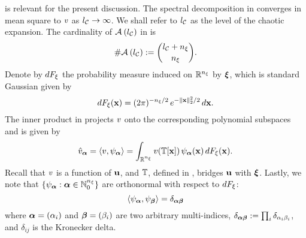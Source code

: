  is relevant for the present discussion.
The spectral decomposition in  converges in mean square to $\w$ as $\nclevel \to \infty$.
We shall refer to $\nclevel$ as the level of the chaotic expansion.
The cardinality of $\chaosMultiindexSet{\nclevel}$ in  is
\[
  \cardinality{\chaosMultiindexSet{\nclevel}} := { \nclevel + \nvars \choose \nvars }.
\]
Denote by $\d\distribution_\z$ the probability measure induced on $\real^\nvars$ by $\vz$, which is standard Gaussian given by
\begin{equation} \xelab{standard-gaussian-measure}
  \d\distribution_\z(\point) = (2 \pi)^{-\nvars/2} \, e^{-\norm[2]{\point}^2 / 2} \, \d\point.
\end{equation}
The inner product in  projects $\w$ onto the corresponding polynomial subspaces and is given by
\begin{equation} \xelab{orthogonal-projection}
  \coefficient{\w}_{\multiindex} = \innerProduct{\w, \polynomial_{\multiindex}} = \int_{\real^{\nvars}} \w(\transformation[\point]) \, \polynomial_{\multiindex}(\point) \, \d\distribution_\z(\point).
\end{equation}
Recall that $\w$ is a function of $\vu$, and $\transformation$, defined in , bridges $\vu$ with $\vz$.
Lastly, we note that $\{ \polynomial_{\multiindex}: \multiindex \in \natural^\nvars \}$ are orthonormal with respect to $\d\distribution_\z$:
\[
  \innerProduct{\polynomial_{\multiindex}, \polynomial_{\multiindex[\beta]}} = \delta_{\multiindex \multiindex[\beta]}
\]
where $\multiindex = (\alpha_i)$ and $\multiindex[\beta] = (\beta_i)$ are two arbitrary multi-indices, $\delta_{\multiindex \multiindex[\beta]} := \prod_i \delta_{\alpha_i \beta_i}$, and $\delta_{ij}$ is the Kronecker delta.

